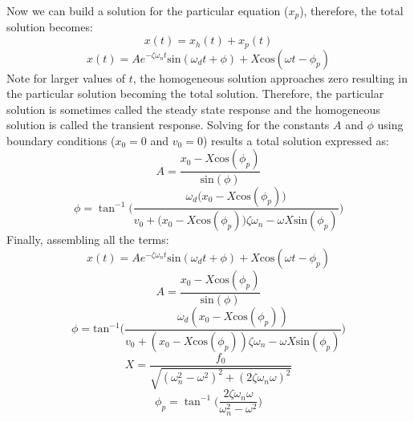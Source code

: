 \documentclass[12pt,letter]{article}
\numberwithin{ex}{section} %
\numberwithin{re}{section} %
\begin{document}
			Now we can build a solution for the particular equation ($x_p$), therefore, the total solution becomes:
			\begin{equation}
				x(t) = x_h(t) + x_p(t)
			\end{equation}
			\begin{equation}
				x(t) = Ae^{-\zeta \omega_n t}\text{sin}(\omega_d t + \phi) +  X \text{cos}(\omega t - \phi_p)
			\end{equation}				
			Note for larger values of $t$, the homogeneous solution approaches zero resulting in the particular solution becoming the total solution. Therefore, the particular solution is sometimes called the steady state response and the homogeneous solution is called the transient response. Solving for the constants $A$ and $\phi$ using boundary conditions ($x_0=0$ and $v_0=0$) results a total solution expressed as:
			\begin{equation}
				A = \frac{x_0 -X \text{cos}(\phi_p)}{\text{sin}(\phi)}
			\end{equation}			 
			\begin{equation}
				\phi =  \tan^{-1} \bigg(\frac{\omega_d \big( x_0 -X \text{cos}(\phi_p)\big)}{v_0 + \big(x_0 - X \text{cos}(\phi_p)\big) \zeta \omega_n - \omega X \text{sin}(\phi_p) }\bigg)
			\end{equation}			
			Finally, assembling all the terms:
			\begin{equation}
				x(t) = Ae^{-\zeta \omega_n t}\text{sin}(\omega_d t + \phi) +  X \text{cos}(\omega t - \phi_p)
				\label{eq:damped_forced_x}
			\end{equation}
			\begin{equation}
				A = \frac{x_0 -X \text{cos}(\phi_p)}{\text{sin}(\phi)}
			\end{equation}			 
			\begin{equation}
				\phi =  \text{tan}^{-1}\bigg(\frac{\omega_d ( x_0 -X \text{cos}(\phi_p))}{v_0 + (x_0 - X \text{cos}(\phi_p)) \zeta \omega_n - \omega X \text{sin}(\phi_p) }\bigg)
			\end{equation}	
			\begin{equation}
				X = \frac{f_0}{\sqrt{(\omega_n^2 - \omega^2)^2 +  (2\zeta \omega_n \omega)^2}} 
			\end{equation}	
			\begin{equation}
				\phi_p = \tan^{-1} \bigg(\frac{2\zeta \omega_n \omega}{\omega_n^2 - \omega^2}\bigg)
				\label{eq:damped_forced_theta_p}
			\end{equation}		
\end{document}
